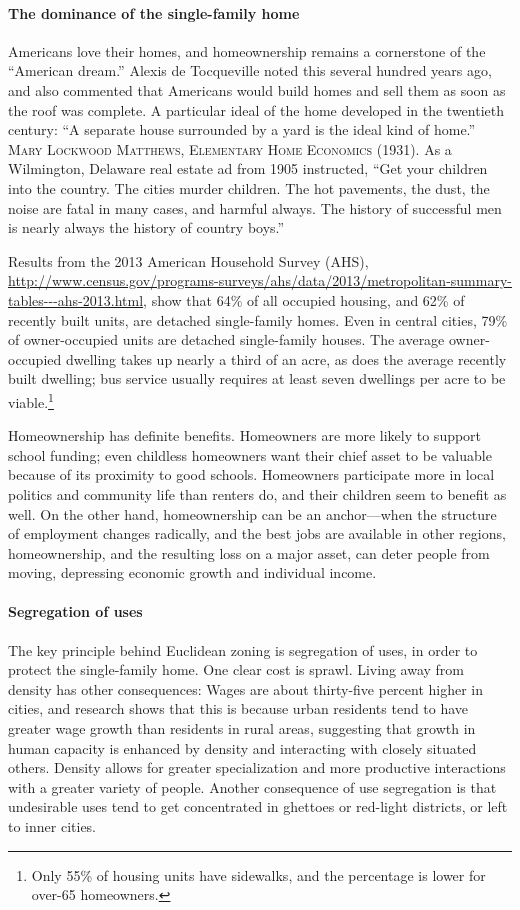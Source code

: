 \paragraph{The dominance of the single-family home} Americans love their homes,
and homeownership remains a cornerstone of the ``American dream.'' Alexis de
Tocqueville noted this several hundred years ago, and also commented that
Americans would build homes and sell them as soon as the roof was complete. A
particular ideal of the home developed in the twentieth century: ``A separate
house surrounded by a yard is the ideal kind of home.'' \textsc{Mary Lockwood
Matthews, Elementary Home Economics} (1931). As a Wilmington, Delaware real
estate ad from 1905 instructed, ``Get your children into the country. The cities
murder children. The hot pavements, the dust, the noise are fatal in many cases,
and harmful always. The history of successful men is nearly always the history
of country boys.''

Results from the 2013 American Household Survey (AHS),
\url{http://www.census.gov/programs-surveys/ahs/data/2013/metropolitan-summary-tables---ahs-2013.html},
show that 64\% of all occupied housing, and 62\% of recently built units, are
detached single-family homes. Even in central cities, 79\% of owner-occupied
units are detached single-family houses. The average owner-occupied dwelling
takes up nearly a third of an acre, as does the average recently built dwelling;
bus service usually requires at least seven dwellings per acre to be
viable.\footnote{Only 55\% of housing units have sidewalks, and the percentage
is lower for over-65 homeowners.} 

Homeownership has definite benefits. Homeowners are more likely to support
school funding; even childless homeowners want their chief asset to be valuable
because of its proximity to good schools. Homeowners participate more in local
politics and community life than renters do, and their children seem to benefit
as well. On the other hand, homeownership can be an anchor---when the structure
of employment changes radically, and the best jobs are available in other
regions, homeownership, and the resulting loss on a major asset, can deter
people from moving, depressing economic growth and individual income.

\paragraph{Segregation of uses} The key principle behind Euclidean zoning is
segregation of uses, in order to protect the single-family home. One clear cost
is sprawl. Living away from density has other consequences: Wages are about
thirty-five percent higher in cities, and research shows that this is because
urban residents tend to have greater wage growth than residents in rural areas,
suggesting that growth in human capacity is enhanced by density and interacting
with closely situated others. Density allows for greater specialization and more
productive interactions with a greater variety of people. Another consequence of
use segregation is that undesirable uses tend to get concentrated in ghettoes or
red-light districts, or left to inner cities.

